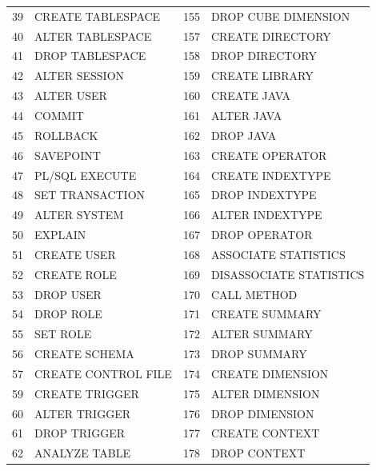\begin{appendix}
\begin{longtable}[]{@{}rl|rl@{}}
39   & CREATE TABLESPACE            & 155 & DROP CUBE DIMENSION          \\
40   & ALTER TABLESPACE             & 157 & CREATE DIRECTORY             \\
41   & DROP TABLESPACE              & 158 & DROP DIRECTORY               \\
42   & ALTER SESSION                & 159 & CREATE LIBRARY               \\
43   & ALTER USER                   & 160 & CREATE JAVA                  \\
44   & COMMIT                       & 161 & ALTER JAVA                   \\
45   & ROLLBACK                     & 162 & DROP JAVA                    \\
46   & SAVEPOINT                    & 163 & CREATE OPERATOR              \\
47   & PL/SQL EXECUTE               & 164 & CREATE INDEXTYPE             \\
48   & SET TRANSACTION              & 165 & DROP INDEXTYPE               \\
49   & ALTER SYSTEM                 & 166 & ALTER INDEXTYPE              \\
50   & EXPLAIN                      & 167 & DROP OPERATOR                \\
51   & CREATE USER                  & 168 & ASSOCIATE STATISTICS         \\
52   & CREATE ROLE                  & 169 & DISASSOCIATE STATISTICS      \\
53   & DROP USER                    & 170 & CALL METHOD                  \\
54   & DROP ROLE                    & 171 & CREATE SUMMARY               \\
55   & SET ROLE                     & 172 & ALTER SUMMARY                \\
56   & CREATE SCHEMA                & 173 & DROP SUMMARY                 \\
57   & CREATE CONTROL FILE          & 174 & CREATE DIMENSION             \\
59   & CREATE TRIGGER               & 175 & ALTER DIMENSION              \\
60   & ALTER TRIGGER                & 176 & DROP DIMENSION               \\
61   & DROP TRIGGER                 & 177 & CREATE CONTEXT               \\
62   & ANALYZE TABLE                & 178 & DROP CONTEXT                 \\

\end{longtable}
\end{appendix}
